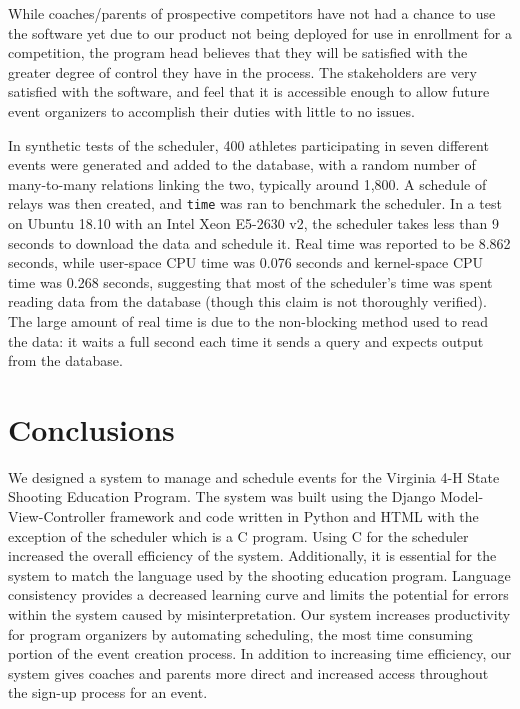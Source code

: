 \documentclass[sigconf]{acmart}
\begin{document}
While coaches/parents of prospective competitors have not had a chance to use the software yet due to our product not being deployed for use in enrollment for a competition, the program head believes that they will be satisfied with the greater degree of control they have in the process. The stakeholders are very satisfied with the software, and feel that it is accessible enough to allow future event organizers to accomplish their duties with little to no issues.

In synthetic tests of the scheduler, 400 athletes participating in seven different events were generated and added to the database, with a random number of many-to-many relations linking the two, typically around 1,800. A schedule of relays was then created, and \texttt{time} was ran to benchmark the scheduler. In a test on Ubuntu 18.10 with an Intel Xeon E5-2630 v2, the scheduler takes less than 9 seconds to download the data and schedule it. Real time was reported to be 8.862 seconds, while user-space CPU time was 0.076 seconds and kernel-space CPU time was 0.268 seconds, suggesting that most of the scheduler's time was spent reading data from the database (though this claim is not thoroughly verified). The large amount of real time is due to the non-blocking method used to read the data: it waits a full second each time it sends a query and expects output from the database.

\section{Conclusions}

We designed a system to manage and schedule events for the Virginia 4-H State Shooting Education Program. The system was built using the Django Model-View-Controller framework and code written in Python and HTML with the exception of the scheduler which is a C program. Using C for the scheduler increased the overall efficiency of the system. Additionally, it is essential for the system to match the language used by the shooting education program. Language consistency provides a decreased learning curve and limits the potential for errors within the system caused by misinterpretation. Our system increases productivity for program organizers by automating scheduling, the most time consuming portion of the event creation process. In addition to increasing time efficiency, our system gives coaches and parents more direct and increased access throughout the sign-up process for an event.
\end{document}

